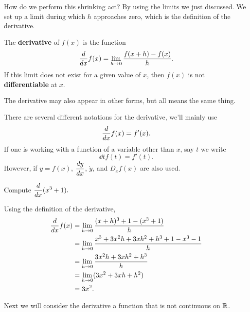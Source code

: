 How do we perform this shrinking act? By using the limits we just discussed. We set up a limit during which $h$ approaches zero, which is the definition of the derivative.

\begin{definition}[Derivative]
    The \textbf{derivative} of $f(x)$ is the function
    $$
    \displaystyle\frac{d}{dx} f(x) = \displaystyle\lim\limits_{h\to 0} \frac{f(x+h) - f(x)}{h}.
    $$
    If this limit does not exist for a given value of $x$, then $f(x)$ is not \textbf{differentiable} at $x$.
\\\cite{mooc}
\end{definition}
The derivative may also appear in other forms, but all means the same thing.
\begin{definition}
    There are several different notations for the derivative, we'll mainly
    use
    $$\displaystyle\frac{d}{dx} f(x) = f'(x).$$
    If one is working with a function of a variable other than $x$, say $t$ we write
    $$\dd{t} f(t) = f'(t).$$
    However, if $y = f(x)$, $\displaystyle\frac{dy}{dx}$, $\dot{y}$, and $D_x f(x)$ are
    also used.
\\\cite{mooc}
\end{definition}

\begin{example}
    Compute $\displaystyle\displaystyle\frac{d}{dx} (x^3 + 1).$ \\
    \begin{solution}
    Using the definition of the derivative,
    \begin{align*}
    \displaystyle\frac{d}{dx} f(x) &= \displaystyle\lim\limits_{h\to 0}\frac{(x+h)^3 + 1 - (x^3 +1)}{h}\\
    &= \displaystyle\lim\limits_{h\to 0}\frac{x^3+3x^2h+3xh^2 + h^3 + 1 - x^3 -1}{h}\\
    &= \displaystyle\lim\limits_{h\to 0}\frac{3x^2h+3xh^2 + h^3}{h}\\
    &= \displaystyle\lim\limits_{h\to 0}(3x^2+3xh + h^2)\\
    &= 3x^2.
    \end{align*}
    \end{solution}
\end{example}

Next we will consider the derivative a function that is not continuous on $\mathbb{R}$.\\


